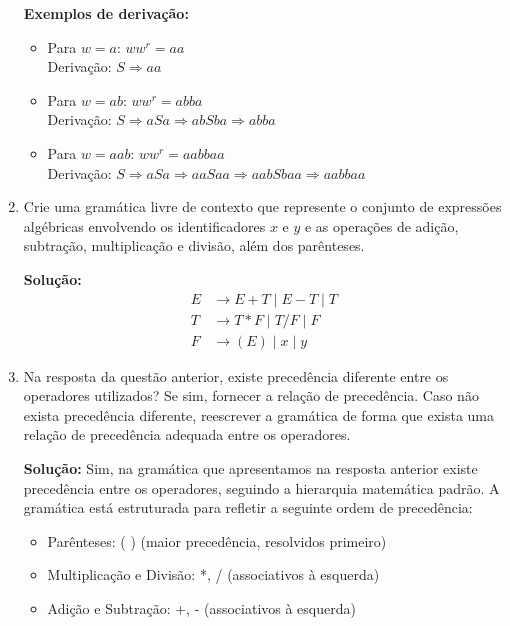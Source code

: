 \documentclass[12pt]{article}
\begin{document}
\begin{enumerate}
	      \textbf{Exemplos de derivação:}
	      \begin{itemize}
		      \item Para $w = a$: $ww^r = aa$ \\
		            Derivação: $S \Rightarrow aa$
		            
		      \item Para $w = ab$: $ww^r = abba$ \\
		            Derivação: $S \Rightarrow aSa \Rightarrow abSba \Rightarrow abba$
		            
		      \item Para $w = aab$: $ww^r = aabbaa$ \\
		            Derivação: $S \Rightarrow aSa \Rightarrow aaSaa \Rightarrow aabSbaa \Rightarrow aabbaa$
	      \end{itemize}
	      
	\item Crie uma gramática livre de contexto que represente o conjunto de expressões algébricas envolvendo os identificadores $x$ e $y$ e as operações de adição, subtração, multiplicação e divisão, além dos parênteses.
	      
	      \textbf{Solução:}
	      \begin{align*}
		      E & \rightarrow E + T \mid E - T \mid T \\
		      T & \rightarrow T * F \mid T / F \mid F \\
		      F & \rightarrow (E) \mid x \mid y
	      \end{align*}
	      
	\item Na resposta da questão anterior, existe precedência diferente entre os operadores utilizados? Se sim, fornecer a relação de precedência. Caso não exista precedência diferente, reescrever a gramática de forma que exista uma relação de precedência adequada entre os operadores.
	      
	      \textbf{Solução:} Sim, na gramática que apresentamos na resposta anterior existe precedência entre os operadores, seguindo a hierarquia matemática padrão. A gramática está estruturada para refletir a seguinte ordem de precedência:
	      \begin{itemize}
		      \item Parênteses: ( ) (maior precedência, resolvidos primeiro)
		      \item Multiplicação e Divisão: *, / (associativos à esquerda)
		      \item Adição e Subtração: +, - (associativos à esquerda)
	      \end{itemize}
	      

\end{enumerate}
\end{document}
